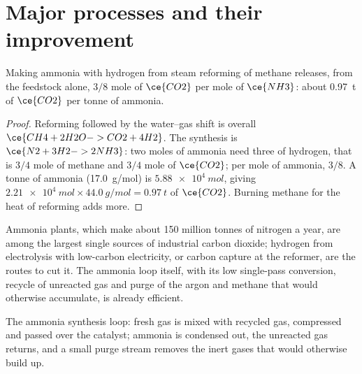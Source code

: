 \section{Major processes and their improvement}

\begin{proposition}\label{prop:b3:green-industrial:smr}
Making ammonia with hydrogen from steam reforming of methane releases, from the
feedstock alone, $3/8$ mole of $\ce{CO2}$ per mole of $\ce{NH3}$: about \qty{0.97}{t} of $\ce{CO2}$ per tonne of ammonia.
\end{proposition}

\begin{proof}
Reforming followed by the water--gas shift is overall $\ce{CH4 + 2H2O -> CO2 + 4H2}$. The synthesis
is $\ce{N2 + 3H2 -> 2NH3}$: two moles of ammonia need three of hydrogen, that is $3/4$ mole of
methane and $3/4$ mole of $\ce{CO2}$; per mole of ammonia, $3/8$. A tonne of ammonia
(\qty{17.0}{g/mol}) is $\qty{5.88e4}{mol}$, giving $\qty{2.21e4}{mol} \times \qty{44.0}{g/mol} = \qty{0.97}{t}$ of $\ce{CO2}$. Burning methane
for the heat of reforming adds more.
\end{proof}

Ammonia plants, which make about 150 million tonnes of nitrogen a year, are among
the largest single sources of industrial carbon dioxide; hydrogen from
electrolysis with low-carbon electricity, or carbon capture at the reformer,
are the routes to cut it. The ammonia loop itself, with its low single-pass
conversion, recycle of unreacted gas and purge of the argon and methane that
would otherwise accumulate, is already efficient.

\begin{omfigure}

{\small The ammonia synthesis loop: fresh gas is mixed with recycled gas,
compressed and passed over the catalyst; ammonia is condensed out, the unreacted
gas returns, and a small purge stream removes the inert gases that would
otherwise build up.}
\end{omfigure}

